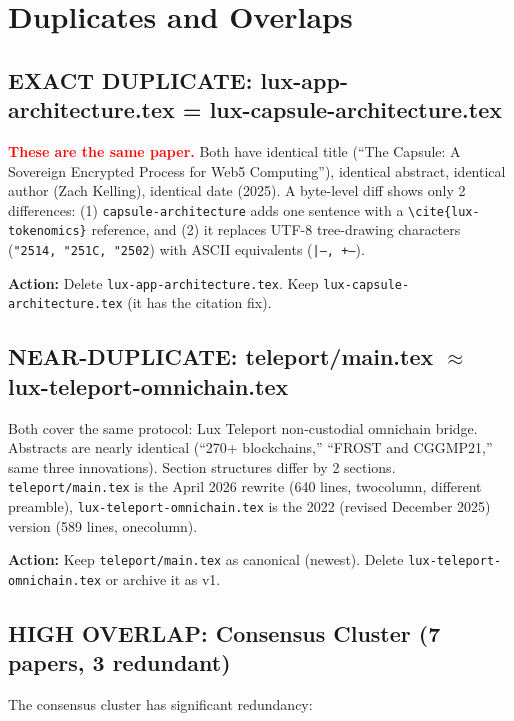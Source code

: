 \documentclass[11pt,a4paper]{article}
\newcommand{\verdict}[1]{\textcolor{red}{\textbf{#1}}}
\begin{document}
\section{Duplicates and Overlaps}\label{sec:dupes}

\subsection{EXACT DUPLICATE: lux-app-architecture.tex = lux-capsule-architecture.tex}

\verdict{These are the same paper.} Both have identical title (``The Capsule:
A Sovereign Encrypted Process for Web5 Computing''), identical abstract,
identical author (Zach Kelling), identical date (2025). A byte-level diff
shows only 2 differences: (1) \texttt{capsule-architecture} adds one sentence
with a \texttt{\textbackslash cite\{lux-tokenomics\}} reference, and (2) it
replaces UTF-8 tree-drawing characters (\texttt{\char"2514, \char"251C,
\char"2502}) with ASCII equivalents (\texttt{|--, +--}).

\textbf{Action:} Delete \texttt{lux-app-architecture.tex}. Keep
\texttt{lux-capsule-architecture.tex} (it has the citation fix).

\subsection{NEAR-DUPLICATE: teleport/main.tex $\approx$ lux-teleport-omnichain.tex}

Both cover the same protocol: Lux Teleport non-custodial omnichain bridge.
Abstracts are nearly identical (``270+ blockchains,'' ``FROST and CGGMP21,''
same three innovations). Section structures differ by 2 sections.
\texttt{teleport/main.tex} is the April 2026 rewrite (640 lines, twocolumn,
different preamble), \texttt{lux-teleport-omnichain.tex} is the 2022
(revised December 2025) version (589 lines, onecolumn).

\textbf{Action:} Keep \texttt{teleport/main.tex} as canonical (newest). Delete
\texttt{lux-teleport-omnichain.tex} or archive it as v1.

\subsection{HIGH OVERLAP: Consensus Cluster (7 papers, 3 redundant)}

The consensus cluster has significant redundancy:
\end{document}
